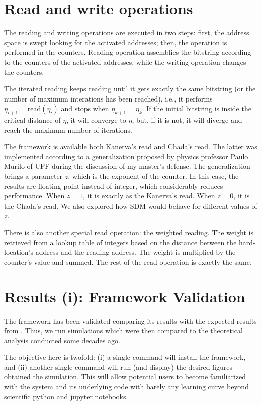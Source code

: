 \section{Read and write operations}

The reading and writing operations are executed in two steps: first, the address space is swept looking for the activated addresses; then, the operation is performed in the counters. Reading operation assemblies the bitstring according to the counters of the activated addresses, while the writing operation changes the counters.

The iterated reading keeps reading until it gets exactly the same bitstring (or the number of maximum interations has been reached), i.e., it performs $\eta_{i+1} = \text{read}(\eta_i)$ and stops when $\eta_{k+1} = \eta_{k}$. If the initial bitstring is inside the critical distance of $\eta$, it will converge to $\eta$, but, if it is not, it will diverge and reach the maximum number of iterations.

The framework is available both Kanerva's read and Chada's read. The latter was implemented according to a generalization proposed by physics professor Paulo Murilo of UFF during the discussion of my master's defense. The generalization brings a parameter $z$, which is the exponent of the counter. In this case, the results are floating point instead of integer, which considerably reduces performance. When $z=1$, it is exactly as the Kanerva's read. When $z=0$, it is the Chada's read. We also explored how SDM would behave for different values of $z$.

There is also another special read operation: the weighted reading. The weight is retrieved from a lookup table of integers based on the distance between the hard-location's address and the reading address. The weight is multiplied by the counter's value and summed. The rest of the read operation is exactly the same.



\section{Results (i): Framework Validation}

The framework has been validated comparing its results with the expected results from \citet{Kanerva1988}. Thus, we run simulations which were then compared to the theoretical analysis conducted some decades ago.

The objective here is twofold: (i) a single command will install the framework, and (ii) another single command will run (and display) the desired figures obtained the simulation. This will allow potential users to become familiarized with the system and its underlying code with barely any learning curve beyond scientific python and jupyter notebooks.

